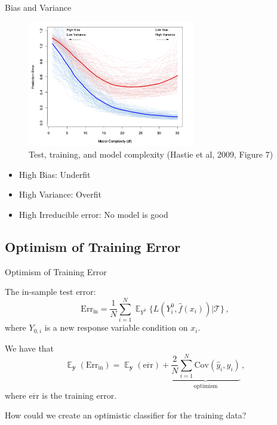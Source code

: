 \documentclass[10pt,handout]{beamer}
\DeclareMathOperator{\E}{\mathbb{E}}
\begin{document}
\begin{frame}{Bias and Variance}

\begin{figure}[h]
\caption{Test, training, and model complexity (Hastie et al, 2009, Figure 7)}
\centering
\includegraphics[width=0.65\textwidth]{figs/ESL_7_1.png}
\end{figure}

\begin{itemize}
\item High Bias: Underfit
\item High Variance: Overfit
\item High Irreducible error: No model is good
\end{itemize}

\end{frame}



\subsection{Optimism of Training Error}

\begin{frame}{Optimism of Training Error}

The in-sample test error:
\[
\text{Err}_\text{in} = \frac{1}{N}\sum^N_{i=1} \E_{Y^0}\{L(Y^0_i,\hat{f}(x_i))|\mathcal{T}\}\,,
\]
where $Y_{0,i}$ is a new response variable condition on $x_i$.\\[3mm]\pause

We have that
\[
\E_\mathbf{y} (\text{Err}_\text{in}) = \E_\mathbf{y}(\overline{\text{err}}) + \underbrace{\frac{2}{N}\sum^N_{i=1} \text{Cov}(\hat{y}_i,y_i)}_{\text{optimism}}\,,
\]
where $\overline{\text{err}}$ is the training error.

How could we create an optimistic classifier for the training data?

\end{frame}
\end{document}
